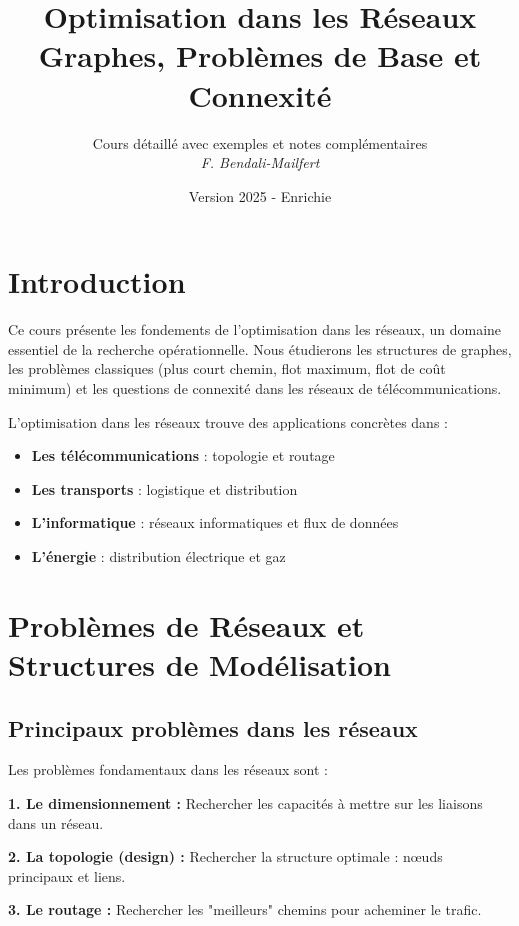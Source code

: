 \documentclass[12pt,a4paper]{article}
\title{\textbf{\Huge\color{titrebleu}Optimisation dans les Réseaux}\\[0.5em]
\large\color{defvert}Graphes, Problèmes de Base et Connexité}
\author{\large Cours détaillé avec exemples et notes complémentaires\\
\textit{F. Bendali-Mailfert}}
\date{\large Version 2025 - Enrichie}
\begin{document}
\maketitle
\tableofcontents
\newpage

\section{Introduction}

\begin{notecours}
Ce cours présente les fondements de l'optimisation dans les réseaux, un domaine essentiel de la recherche opérationnelle. Nous étudierons les structures de graphes, les problèmes classiques (plus court chemin, flot maximum, flot de coût minimum) et les questions de connexité dans les réseaux de télécommunications.
\end{notecours}

\begin{important}
L'optimisation dans les réseaux trouve des applications concrètes dans :
\begin{itemize}
    \item \textcolor{titrebleu}{\textbf{Les télécommunications}} : topologie et routage
    \item \textcolor{defvert}{\textbf{Les transports}} : logistique et distribution
    \item \textcolor{algoviolet}{\textbf{L'informatique}} : réseaux informatiques et flux de données
    \item \textcolor{exempleorange}{\textbf{L'énergie}} : distribution électrique et gaz
\end{itemize}
\end{important}

\newpage
\section{Problèmes de Réseaux et Structures de Modélisation}

\subsection{Principaux problèmes dans les réseaux}

\begin{definition}
Les problèmes fondamentaux dans les réseaux sont :

\textbf{1. Le dimensionnement :}
Rechercher les capacités à mettre sur les liaisons dans un réseau.

\textbf{2. La topologie (design) :}
Rechercher la structure optimale : nœuds principaux et liens.

\textbf{3. Le routage :}
Rechercher les "meilleurs" chemins pour acheminer le trafic.
\end{definition}
\end{document}
